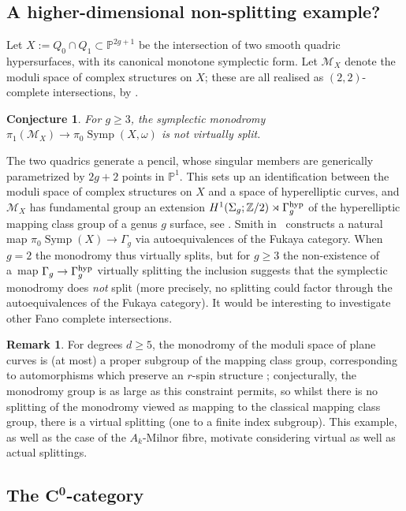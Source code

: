 \documentclass[pdftex]{sigma}
\DeclareMathOperator{\Symp}{Symp}
\def\bP{\mathbb{P}}
\def\bZ{\mathbb{Z}}
\newtheorem{conj}[thm]{Conjecture}
\theoremstyle{definition}
\newtheorem{rmk}[thm]{Remark}
\numberwithin{equation}{section}
\begin{document}
\subsection{A higher-dimensional non-splitting example?}

Let $X:= Q_0 \cap Q_1 \subset \bP^{2g+1}$ be the intersection of two smooth quadric hypersurfaces, with its canonical monotone symplectic form. Let $\mathcal{M}_X$ denote the moduli space of complex structures on $X$; these are all realised as $(2,2)$-complete intersections, by \cite[Theorem~1]{Ionescu}.

\begin{conj}
 For $g \geq 3$, the symplectic monodromy
$
 \pi_1(\mathcal{M}_X) \to \pi_0\Symp(X,\omega)$
 is not virtually split.
\end{conj}

 The two quadrics generate a pencil, whose singular members are generically parametrized by $2g+2$ points in $\bP^1$. This sets up an identification between the moduli space of complex structures on $X$ and a space of hyperelliptic curves, and $\mathcal{M}_X$ has fundamental group an extension $H^1(\Sigma_g;\bZ/2) \rtimes \Gamma_g^{\rm hyp}$ of the hyperelliptic mapping class group of a genus $g$ surface, see \cite{Reid,Smith}.
Smith in~\cite{Smith} constructs a natural map $ \pi_0\Symp(X) \to \Gamma_g$
 via autoequivalences of the Fukaya category. When $g=2$ the monodromy thus virtually splits, but for $g \geq 3$ the non-existence of a~map $\Gamma_g \to \Gamma_g^{\rm hyp}$ virtually splitting the inclusion suggests that the symplectic monodromy does \emph{not} split (more precisely, no splitting could factor through the autoequivalences of the Fukaya category). It would be interesting to investigate other Fano complete intersections.

 \begin{rmk}
 For degrees $d \geq 5$, the monodromy of the moduli space of plane curves is (at most) a proper subgroup of the mapping class group, corresponding to automorphisms which preserve an $r$-spin structure \cite{Salter}; conjecturally, the monodromy group is as large as this constraint permits, so whilst there is no splitting of the monodromy viewed as mapping to the classical mapping class group, there is a virtual splitting (one to a finite index subgroup). This example, as well as the case of the $A_k$-Milnor fibre, motivate considering virtual as well as actual splittings.
\end{rmk}

\subsection[The C\^{}0-category]{The $\boldsymbol{C^0}$-category}
\end{document}
